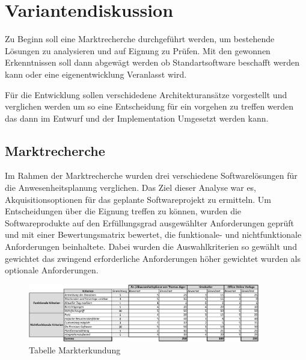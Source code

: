 \section{Variantendiskussion}
\label{sec:Variantendiskussion}
Zu Beginn soll eine Marktrecherche durchgeführt werden, um bestehende Lösungen zu analysieren und auf Eignung zu Prüfen. Mit den gewonnen Erkenntnissen soll dann abgewägt werden ob Standartsoftware beschafft werden kann oder eine eigenentwicklung Veranlasst wird.

Für die Entwicklung sollen verschidedene Architekturansätze vorgestellt und verglichen werden um so eine Entscheidung für ein vorgehen zu treffen werden das dann im Entwurf und der Implementation Umgesetzt werden kann.

\subsection{Marktrecherche}
\label{sec:Marktrecherche}
Im Rahmen der Marktrecherche wurden drei verschiedene Softwarelösungen für die Anwesenheitsplanung verglichen. Das Ziel dieser Analyse war es, Akquisitionsoptionen für das geplante Softwareprojekt zu ermitteln. Um Entscheidungen über die Eignung treffen zu können, wurden die Softwareprodukte auf den Erfüllungsgrad ausgewählter Anforderungen geprüft und mit einer Bewertungsmatrix bewertet, die funktionale- und nichtfunktionale Anforderungen beinhaltete. Dabei wurden die Auswahlkriterien so gewählt und gewichtet das zwingend erforderliche Anforderungen höher gewichtet wurden als optionale Anforderungen.

\begin{figure}[htbp]
    \centering
    \includegraphics[width=0.9\textwidth,angle=0]{abb/Markterkundung.pdf}
    \caption[Beschreibung]{ Tabelle Markterkundung}
    \label{tab:Markterkundung}
\end{figure}

